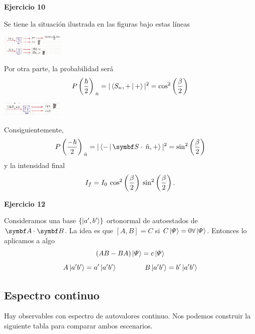 \documentclass[10pt,oneside]{CBFT_book}
\begin{document}
\begin{ejemplo}{\bf Ejercicio 10}

Se tiene la situación ilustrada en las figuras bajo estas líneas

\includegraphics[width=0.225\textwidth]{images/fig_ft2_ejercicio10A.jpg}

Por otra parte, la probabilidad será
\[
	P\left( \frac{ \hbar }{ 2 } \right)_{\:\hat{n}} = |\Braket{S_n,+|+}|^2 = \cos^2\left( \frac{ \beta }{ 2 } \right)
\]

\includegraphics[width=0.225\textwidth]{images/fig_ft2_ejercicio10B.jpg}

Consiguientemente,
\[
	P\Frac{-\hbar}{2}_{\nver} = |\Braket{-|\vb S\cdot\nver,+}|^2 = \sin^2\Frac{\b}{2}
\]
y la intensidad final
\[
	I_f = I_0 \: \cos^2\left( \frac{ \beta }{ 2 } \right) \: \sin^2\left( \frac{ \beta }{ 2 } \right).
\]
 
\end{ejemplo}

\begin{ejemplo}{\bf Ejercicio 12}
 
Consideramos una base $\{ \Ket{a',b'} \}$ ortonormal de autoestados de $\vb A\cdot \vb B$.
La idea es que $ [A,B] = C$ si $C\Ket{\Psi} = 0 \forall \Ket{\Psi}$.
Entonces lo aplicamos a algo
\[
	(AB - BA)\Ket{\Psi} = c\Ket{\Psi}
\]
\[
	A\Ket{a'b'} = a' \Ket{a'b'}  \qquad \qquad B\Ket{a'b'} = b' \Ket{a'b'}
\]
 
\end{ejemplo}

\subsection{Espectro continuo}

Hay observables con espectro de autovalores continuo.
Nos podemos construir la siguiente tabla para comparar ambos escenarios.
\end{document}
